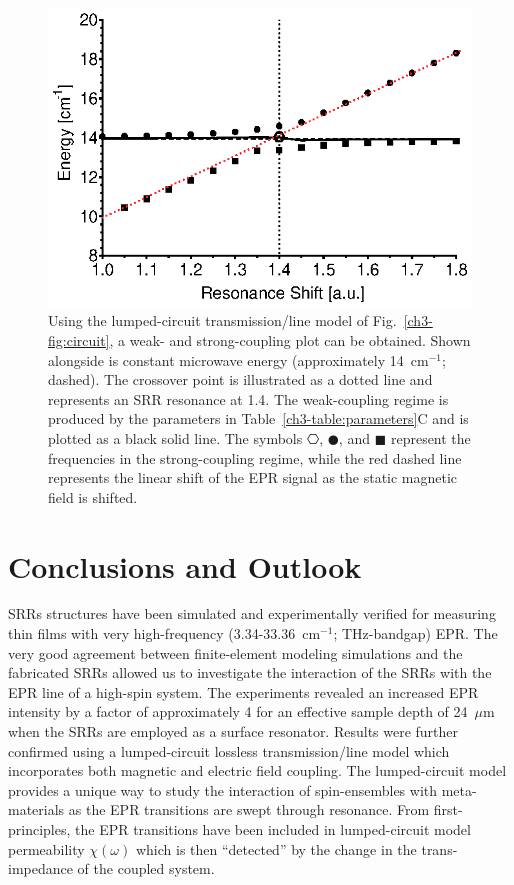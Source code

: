 \begin{figure}[htp]\centering
  \includegraphics{Kapitel/Ch3-Images/08-RadiationDampening.eps}%
  \caption[Calculated weak- and strong-coupling regime using the analytical model.]{Using the lumped-circuit transmission\-/line model of Fig.~\ref{ch3-fig:circuit}, a weak- and strong-coupling plot can be obtained. Shown alongside is constant microwave energy (approximately 14~cm$^{-1}$; dashed). The crossover point is illustrated as a dotted line and represents an SRR resonance at 1.4. The weak-coupling regime is produced by the parameters in Table~\ref{ch3-table:parameters}C and is plotted as a black solid line. The symbols $\hexagon$, $\CIRCLE$, and $\blacksquare$ represent the frequencies in the strong-coupling regime, while the red dashed line represents the linear shift of the EPR signal as the static magnetic field is shifted.}\label{ch3-fig:strong-weak}
\end{figure}

\section{Conclusions and Outlook}
SRRs structures have been simulated and experimentally verified for measuring thin films with very high-frequency (3.34-33.36~cm$^{-1}$; THz-bandgap) EPR. The very good agreement between finite-element modeling simulations and the fabricated SRRs allowed us to investigate the interaction of the SRRs with the EPR line of a high-spin system. The experiments revealed an increased EPR intensity by a factor of approximately 4 for an effective sample depth of 24~$\mu$m when the SRRs are employed as a surface resonator. Results were further confirmed using a lumped-circuit lossless transmission\-/line model which incorporates both magnetic and electric field coupling. The lumped-circuit model provides a unique way to study the interaction of spin-ensembles with meta-materials as the EPR transitions are swept through resonance. From first-principles, the EPR transitions have been included in lumped-circuit model permeability $\chi(\omega)$ which is then ``detected'' by the change in the trans-impedance of the coupled system.

